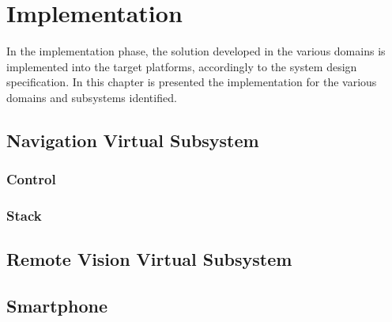 \chapter{Implementation}%
\label{ch:implementation}
In the implementation phase, the solution developed in the various domains is
implemented into the target platforms, accordingly to the system design
specification. In this chapter is presented the implementation for the various domains and subsystems identified.
%
\section{Navigation Virtual Subsystem}%
\label{sec:navig-virt-subsyst-implem}
%
%
\subsection{Control}%
\label{sec:control-design}

%
\subsection{Stack}%
\label{sec:stack-implem}

%
\section{Remote Vision Virtual Subsystem}%
\label{sec:remote-visi-subsyst-design}
%
%
\section{Smartphone}%
\label{sec:smartphone-implem}

%
